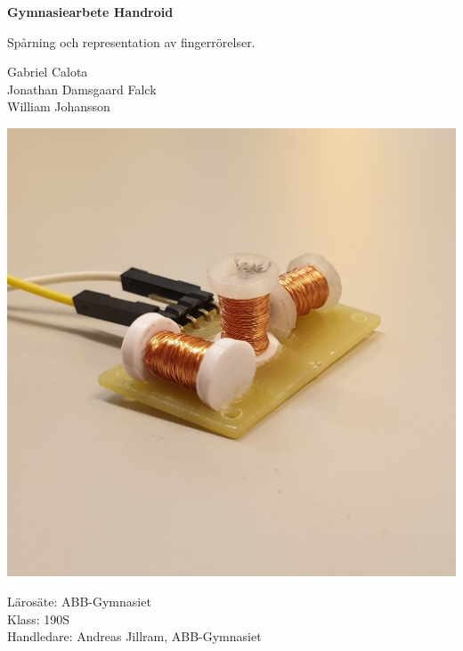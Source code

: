 \begin{titlepage}
    \centering

    \vspace*{0,5cm}

    \begin{LARGE}
        \textbf{Gymnasiearbete Handroid}
    \end{LARGE}

    \begin{Large}

        \vspace{1cm}

        Spårning och representation av fingerrörelser.

    \end{Large}

    \vspace{1cm}

    \begin{large}
        Gabriel Calota\\
        Jonathan Damsgaard Falck\\
        William Johansson
    \end{large}

    \vspace{0.5cm}
    \includegraphics[width=\textwidth]{images/Spolhubb1.jpg}
    \vfill

    \begin{large}
        Lärosäte: ABB-Gymnasiet\\
        \vspace{0.5cm}
        Klass: 190S\\
        \vspace{0.5cm}
        Handledare: Andreas Jillram, ABB-Gymnasiet
    \end{large}

\end{titlepage}
